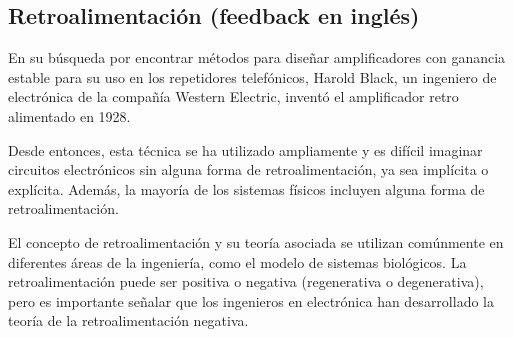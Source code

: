     \subsection{Retroalimentación (feedback en inglés)}

        En su búsqueda por encontrar métodos para diseñar amplificadores con ganancia estable para su uso en los repetidores telefónicos, Harold Black, un ingeniero de electrónica de la compañía Western Electric, inventó el amplificador retro alimentado en 1928. 
        
        Desde entonces, esta técnica se ha utilizado ampliamente y es difícil imaginar circuitos electrónicos sin alguna forma de retroalimentación, ya sea implícita o explícita. Además, la mayoría de los sistemas físicos incluyen alguna forma de retroalimentación.
        
        El concepto de retroalimentación y su teoría asociada se utilizan comúnmente en diferentes áreas de la ingeniería, como el modelo de sistemas biológicos. La retroalimentación puede ser positiva o negativa (regenerativa o degenerativa), pero es importante señalar que los ingenieros en electrónica han desarrollado la teoría de la retroalimentación negativa. 
        
